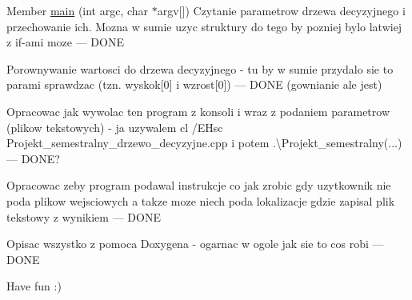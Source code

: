 
\begin{DoxyRefList}
\item[Member \mbox{\hyperlink{_projekt__semestralny__drzewo__decyzyjne__sekcja06_8cpp_a0ddf1224851353fc92bfbff6f499fa97}{main}} (int argc, char $\ast$argv\mbox{[}\mbox{]})]\label{todo__todo000001}%
%
Czytanie parametrow drzewa decyzyjnego i przechowanie ich. Mozna w sumie uzyc struktury do tego by pozniej bylo latwiej z if-\/ami moze --- DONE

\label{todo__todo000002}%
%
Porownywanie wartosci do drzewa decyzyjnego -\/ tu by w sumie przydalo sie to parami sprawdzac (tzn. wyskok\mbox{[}0\mbox{]} i wzrost\mbox{[}0\mbox{]}) --- DONE (gownianie ale jest)

\label{todo__todo000003}%
%
Opracowac jak wywolac ten program z konsoli i wraz z podaniem parametrow (plikow tekstowych) -\/ ja uzywalem cl /\+EHsc Projekt\+\_\+semestralny\+\_\+drzewo\+\_\+decyzyjne.\+cpp i potem .\textbackslash{}\+Projekt\+\_\+semestralny(...) --- DONE?

\label{todo__todo000004}%
%
Opracowac zeby program podawal instrukcje co jak zrobic gdy uzytkownik nie poda plikow wejsciowych a takze moze niech poda lokalizacje gdzie zapisal plik tekstowy z wynikiem --- DONE

\label{todo__todo000005}%
%
Opisac wszystko z pomoca Doxygena -\/ ogarnac w ogole jak sie to cos robi --- DONE

\label{todo__todo000006}%
%
Have fun \+:)
\end{DoxyRefList}